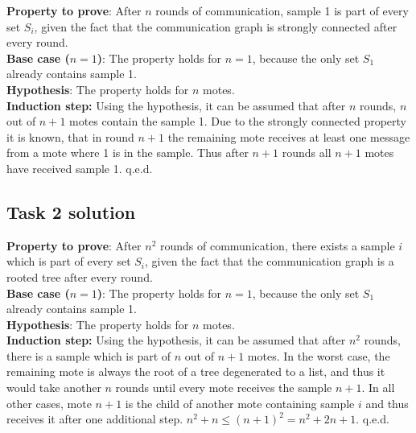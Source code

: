 \documentclass[12pt,a4paper,titlepage,oneside]{article}
\renewcommand{\leq}[0]{\leqslant}
\begin{document}
\textbf{Property to prove}: After $n$ rounds of communication, sample 1 is part of 
every set $S_i$, given the fact that the communication graph is strongly 
connected after every round.\\
\textbf{Base case ($n=1$)}: The property holds for $n=1$, because the only set $S_1$
already contains sample 1.\\
\textbf{Hypothesis}: The property holds for $n$ motes.\\
\textbf{Induction step:} Using the hypothesis, it can be assumed that after $n$ rounds,
$n$ out of $n+1$ motes contain the sample 1. Due to the strongly connected property it
is known, that in round $n+1$ the remaining mote receives at least one message from a
mote where 1 is in the sample. Thus after $n+1$ rounds all $n+1$ motes have received
sample 1. q.e.d.

\subsection{Task 2 solution}

\textbf{Property to prove}: After $n^2$ rounds of communication, there exists a sample
$i$ which is part of every set $S_i$, given the fact that the communication graph is a 
rooted tree after every round.\\
\textbf{Base case ($n=1$)}: The property holds for $n=1$, because the only set $S_1$
already contains sample 1.\\
\textbf{Hypothesis}: The property holds for $n$ motes.\\
\textbf{Induction step:} Using the hypothesis, it can be assumed that after $n^2$ rounds,
there is a sample which is part of $n$ out of $n+1$ motes. In the worst case, the remaining
mote is always the root of a tree degenerated to a list, and thus it would take another
$n$ rounds until every mote receives the sample $n+1$. In all other cases, mote $n+1$ is
the child of another mote containing sample $i$ and thus receives it after one additional
step. $n^2+n \leq (n+1)^2 = n^2 + 2n + 1$. q.e.d.

\newpage
\end{document}

